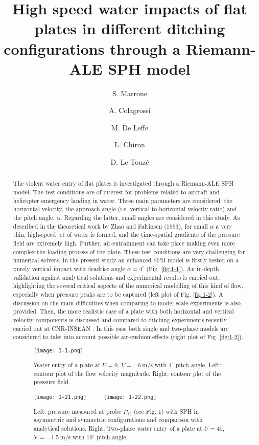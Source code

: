 \documentclass[10pt]{article}
\title{High speed water impacts of flat plates in different ditching configurations through a Riemann-ALE SPH model}
\date{}
\author[1]{S. Marrone}
\author[1,3]{A. Colagrossi}
\author[2]{M. De Leffe}
\author[2]{L. Chiron}
\author[3]{D. Le Touz\'e}
\affil[1]{CNR-INSEAN, - Marine Tech. Research Inst., Rome, Italy}
\affil[2]{NEXTFLOW Software, Nantes, France}
\affil[3]{\'Ecole Centrale Nantes, LHEEA research dept., Nantes, France}
\begin{document}
\maketitle

\begin{abstract}
The violent water entry of flat plates is investigated through a Riemann-ALE SPH model. The test conditions are of interest for problems related to aircraft and helicopter emergency landing in water. Three main parameters are considered: the horizontal velocity, the approach angle (i.e. vertical to horizontal velocity ratio) and the pitch angle, $\alpha$. Regarding the latter, small angles are considered in this study. As described in the theoretical work by Zhao and Faltinsen (1993), for small $\alpha$ a very thin, high-speed jet of water is formed, and the time-spatial gradients of the pressure field are extremely high. Further, air-entrainment can take place making even more complex the loading process of the plate. These test conditions are very challenging for numerical solvers. In the present study an enhanced SPH model \cite{oger2016sph} is firstly tested on a purely vertical impact with deadrise angle $\alpha=4^\circ$ (Fig. \ref{fig:1-1}). An in-depth validation against analytical solutions and experimental results is carried out, highlighting the several critical aspects of the numerical modelling of this kind of flow, especially when pressure peaks are to be captured (left plot of Fig. \ref{fig:1-2}). A discussion on the main difficulties when comparing to model scale experiments is also provided. Then, the more realistic case of a plate with both horizontal and vertical velocity components is discussed and compared to ditching experiments recently carried out at CNR-INSEAN \cite{iafrati2016experimental}. In this case both single and two-phase models are considered to take into account possible air-cushion effects (right plot of Fig. \ref{fig:1-2}).
\begin{figure}[!htb]
\centering
\texttt{[image: 1-1.png]}
\caption{Water entry of a plate at $U = 0$, $V = -6~\mathrm{m/s}$ with $4^\circ$ pitch angle. Left: contour plot of the flow velocity magnitude. Right: contour plot of the pressure field.}\label{fig:1-1}
\end{figure}
\begin{figure}[!htb]
\centering
\texttt{[image: 1-21.png]}~~~~~
\texttt{[image: 1-22.png]}
\caption{Left: pressure measured at probe $P_{12}$ (see Fig. 1) with SPH in asymmetric and symmetric configurations and comparison with analytical solutions. Right: Two-phase water entry of a plate at $U = 40$, V$ = -1.5~\mathrm{m/s}$ with $10^\circ$ pitch angle.}\label{fig:1-2}
\end{figure}
\end{abstract}

\addbib
\end{document}
